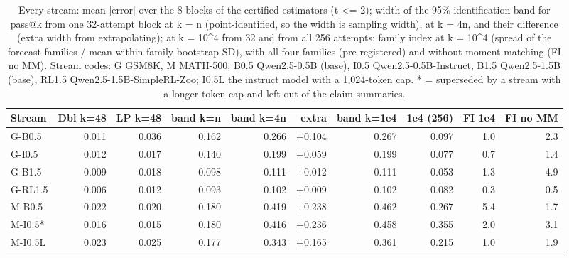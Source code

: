\begin{table}[t]
\centering
\small
\begin{tabular}{lrrrrrrrrr}
\toprule
Stream & Dbl k=48 & LP k=48 & band k=n & band k=4n & extra & band k=1e4 & 1e4 (256) & FI 1e4 & FI no MM \\
\midrule
G-B0.5 & 0.011 & 0.036 & 0.162 & 0.266 & +0.104 & 0.267 & 0.097 & 1.0 & 2.3 \\
G-I0.5 & 0.012 & 0.017 & 0.140 & 0.199 & +0.059 & 0.199 & 0.077 & 0.7 & 1.4 \\
G-B1.5 & 0.009 & 0.018 & 0.098 & 0.111 & +0.012 & 0.111 & 0.053 & 1.3 & 4.9 \\
G-RL1.5 & 0.006 & 0.012 & 0.093 & 0.102 & +0.009 & 0.102 & 0.082 & 0.3 & 0.5 \\
M-B0.5 & 0.022 & 0.020 & 0.180 & 0.419 & +0.238 & 0.462 & 0.267 & 5.4 & 1.7 \\
M-I0.5* & 0.016 & 0.015 & 0.180 & 0.416 & +0.236 & 0.458 & 0.355 & 2.0 & 3.1 \\
M-I0.5L & 0.023 & 0.025 & 0.177 & 0.343 & +0.165 & 0.361 & 0.215 & 1.0 & 1.9 \\
\bottomrule
\end{tabular}
\caption{Every stream: mean |error| over the 8 blocks of the certified estimators (t <= 2); width of the 95\% identification band for pass@k from one 32-attempt block at k = n (point-identified, so the width is sampling width), at k = 4n, and their difference (extra width from extrapolating); at k = 10^4 from 32 and from all 256 attempts; family index at k = 10^4 (spread of the forecast families / mean within-family bootstrap SD), with all four families (pre-registered) and without moment matching (FI no MM). Stream codes: G GSM8K, M MATH-500; B0.5 Qwen2.5-0.5B (base), I0.5 Qwen2.5-0.5B-Instruct, B1.5 Qwen2.5-1.5B (base), RL1.5 Qwen2.5-1.5B-SimpleRL-Zoo; I0.5L the instruct model with a 1,024-token cap. * = superseded by a stream with a longer token cap and left out of the claim summaries.}
\label{tab:T12b_streams_extrapolation}
\end{table}
